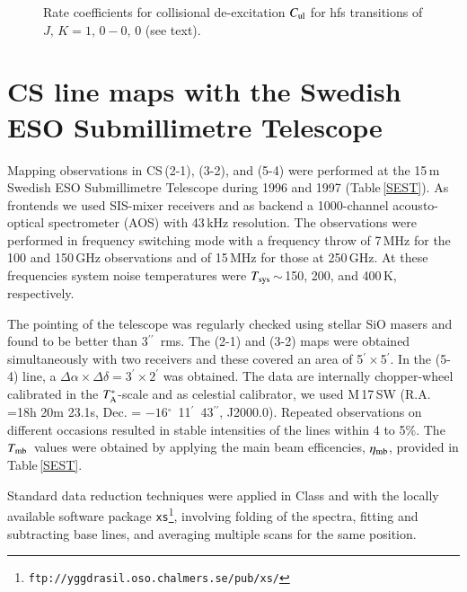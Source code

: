 \documentclass{aa}
\newcommand{\tas}{$T^{*}_{\rm A}$}
\newcommand{\tmb}{$T_{\rm mb}$}
\newcommand{\tsys}{$T_{\rm sys}$}
\newcommand{\about}{$\sim$}                       %
\newcommand{\amin}{$^{\prime}$}                   %
\newcommand{\asec}{$^{\prime \prime}$}
\newcommand{\adeg}{$^{\circ}$}
\begin{document}
\begin{figure}
  \caption{Rate coefficients for collisional de-excitation $C_{\rm ul}$ for hfs transitions of $J,\,K = 1,\,0 - 0,\,0$ (see  text).
  }
  \label{nh3_coll}
\end{figure}



\section{CS line maps with the Swedish ESO Submillimetre Telescope }

Mapping observations in CS\,(2-1), (3-2), and (5-4) were performed at the 15\,m Swedish ESO Submillimetre Telescope \citep[SEST,][]{booth1989} during 1996 and 1997 (Table\,\ref{SEST}). As frontends we used SIS-mixer receivers and as backend a 1000-channel acousto-optical spectrometer (AOS) with 43\,kHz resolution. The observations were performed in frequency switching mode with a frequency throw of 7\,MHz for the 100 and 150\,GHz observations and of 15\,MHz for those at 250\,GHz. At these frequencies system noise temperatures were \tsys\,\about\,150, 200, and 400\,K, respectively. 

The pointing of the telescope was regularly checked using stellar SiO masers and found to be better than 3\asec\ rms. The (2-1) and (3-2) maps were obtained simultaneously with two receivers and these covered an area of 5\amin\,$\times$\,5\amin. In the (5-4) line, a $\Delta \alpha \times \Delta \delta = 3^{\prime} \times 2^{\prime}$ was obtained. The data are internally chopper-wheel calibrated in the \tas-scale \citep{ulich1976} and as celestial calibrator,  we used M\,17\,SW (R.A. =18h 20m 23.1s, Dec. = $-16$\adeg\ 11\amin\ 43\asec, J2000.0).  Repeated observations on different occasions resulted in stable intensities of the lines within 4 to 5\%. The \tmb\ values were obtained by applying the main beam efficencies, $\eta_{\rm mb}$, provided in Table\,\ref{SEST}.

Standard data reduction techniques were applied in Class and with the locally available software package \texttt{xs}\footnote{\texttt{ftp://yggdrasil.oso.chalmers.se/pub/xs/}}, involving folding of the spectra, fitting and subtracting base lines, and averaging multiple scans for the same position. 
\end{document}
